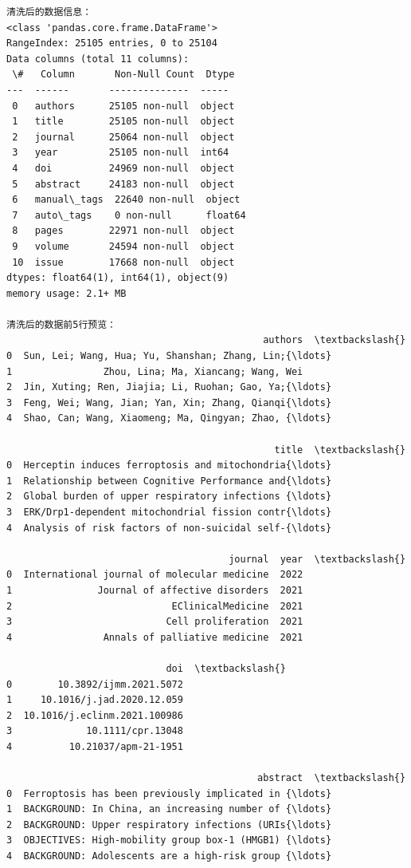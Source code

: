 \documentclass[11pt]{article}
\begin{document}
    \begin{Verbatim}[commandchars=\\\{\}]
清洗后的数据信息：
<class 'pandas.core.frame.DataFrame'>
RangeIndex: 25105 entries, 0 to 25104
Data columns (total 11 columns):
 \#   Column       Non-Null Count  Dtype
---  ------       --------------  -----
 0   authors      25105 non-null  object
 1   title        25105 non-null  object
 2   journal      25064 non-null  object
 3   year         25105 non-null  int64
 4   doi          24969 non-null  object
 5   abstract     24183 non-null  object
 6   manual\_tags  22640 non-null  object
 7   auto\_tags    0 non-null      float64
 8   pages        22971 non-null  object
 9   volume       24594 non-null  object
 10  issue        17668 non-null  object
dtypes: float64(1), int64(1), object(9)
memory usage: 2.1+ MB

清洗后的数据前5行预览：
                                             authors  \textbackslash{}
0  Sun, Lei; Wang, Hua; Yu, Shanshan; Zhang, Lin;{\ldots}
1                Zhou, Lina; Ma, Xiancang; Wang, Wei
2  Jin, Xuting; Ren, Jiajia; Li, Ruohan; Gao, Ya;{\ldots}
3  Feng, Wei; Wang, Jian; Yan, Xin; Zhang, Qianqi{\ldots}
4  Shao, Can; Wang, Xiaomeng; Ma, Qingyan; Zhao, {\ldots}

                                               title  \textbackslash{}
0  Herceptin induces ferroptosis and mitochondria{\ldots}
1  Relationship between Cognitive Performance and{\ldots}
2  Global burden of upper respiratory infections {\ldots}
3  ERK/Drp1-dependent mitochondrial fission contr{\ldots}
4  Analysis of risk factors of non-suicidal self-{\ldots}

                                       journal  year  \textbackslash{}
0  International journal of molecular medicine  2022
1               Journal of affective disorders  2021
2                            EClinicalMedicine  2021
3                           Cell proliferation  2021
4                Annals of palliative medicine  2021

                            doi  \textbackslash{}
0        10.3892/ijmm.2021.5072
1     10.1016/j.jad.2020.12.059
2  10.1016/j.eclinm.2021.100986
3             10.1111/cpr.13048
4          10.21037/apm-21-1951

                                            abstract  \textbackslash{}
0  Ferroptosis has been previously implicated in {\ldots}
1  BACKGROUND: In China, an increasing number of {\ldots}
2  BACKGROUND: Upper respiratory infections (URIs{\ldots}
3  OBJECTIVES: High-mobility group box-1 (HMGB1) {\ldots}
4  BACKGROUND: Adolescents are a high-risk group {\ldots}


\end{Verbatim}
\end{document}
